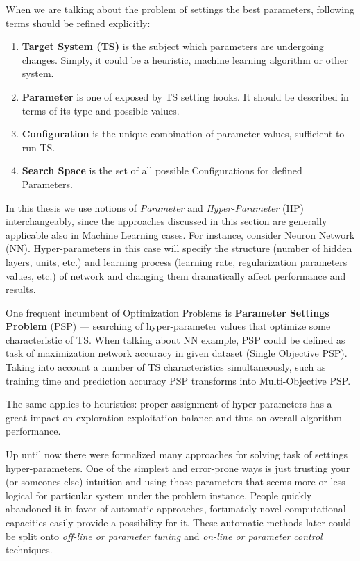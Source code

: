 When we are talking about the problem of settings the best parameters, following terms should be refined explicitly:
\begin{enumerate}
	\item \textbf{Target System (TS)} is the subject which parameters are undergoing changes. Simply, it could be a heuristic, machine learning algorithm or other system.
	\item \textbf{Parameter} is one of exposed by TS setting hooks. It should be described in terms of its type and possible values.
	\item \textbf{Configuration} is the unique combination of parameter values, sufficient to run TS.
	\item \textbf{Search Space} is the set of all possible Configurations for defined Parameters.
\end{enumerate}

In this thesis we use notions of \textit{Parameter} and \textit{Hyper-Parameter} (HP) interchangeably, since the approaches discussed in this section are generally applicable also in Machine Learning cases. For instance, consider Neuron Network (NN). Hyper-parameters in this case will specify the structure (number of hidden layers, units, etc.) and learning process (learning rate, regularization parameters values, etc.) of network and changing them dramatically affect performance and results.

One frequent incumbent of Optimization Problems is \textbf{Parameter Settings Problem} (PSP) — searching of hyper-parameter values that optimize some characteristic of TS. When talking about NN example, PSP could be defined as task of maximization network accuracy in given dataset (Single Objective PSP). Taking into account a number of TS characteristics simultaneously, such as training time and prediction accuracy PSP transforms into Multi-Objective PSP.

The same applies to heuristics: proper assignment of hyper-parameters has a great impact on exploration-exploitation balance and thus on overall algorithm performance.

Up until now there were formalized many approaches for solving task of settings hyper-parameters. 
One of the simplest and error-prone ways is just trusting your (or someones else) intuition and using those parameters that seems more or less logical for particular system under the problem instance. People quickly abandoned it in favor of automatic approaches, fortunately novel computational capacities easily provide a possibility for it. These automatic methods later could be split onto \textit{off-line or parameter tuning} and \textit{on-line or parameter control} techniques.

